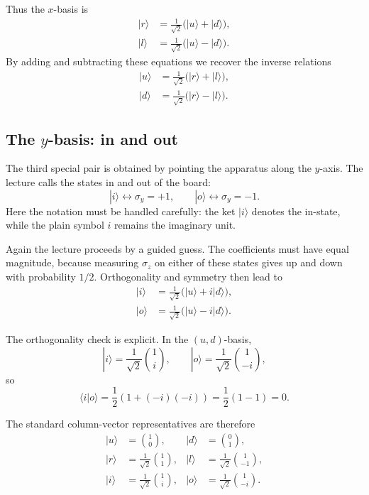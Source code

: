 Thus the \(x\)-basis is
\begin{align}
|r\rangle &= \frac{1}{\sqrt2}\bigl(|u\rangle+|d\rangle\bigr),\\
|l\rangle &= \frac{1}{\sqrt2}\bigl(|u\rangle-|d\rangle\bigr).
\end{align}
By adding and subtracting these equations we recover the inverse relations
\begin{align}
|u\rangle &= \frac{1}{\sqrt2}\bigl(|r\rangle+|l\rangle\bigr),\\
|d\rangle &= \frac{1}{\sqrt2}\bigl(|r\rangle-|l\rangle\bigr).
\end{align}

\subsection{The \(y\)-basis: in and out}

The third special pair is obtained by pointing the apparatus along the \(y\)-axis. The lecture calls the states in and out of the board:
\[
|i\rangle \leftrightarrow \sigma_y=+1,\qquad |o\rangle \leftrightarrow \sigma_y=-1.
\]
Here the notation must be handled carefully: the ket \(|i\rangle\) denotes the in-state, while the plain symbol \(i\) remains the imaginary unit.

Again the lecture proceeds by a guided guess. The coefficients must have equal magnitude, because measuring \(\sigma_z\) on either of these states gives up and down with probability \(1/2\). Orthogonality and symmetry then lead to
\begin{align}
|i\rangle &= \frac{1}{\sqrt2}\bigl(|u\rangle+i|d\rangle\bigr),\\
|o\rangle &= \frac{1}{\sqrt2}\bigl(|u\rangle-i|d\rangle\bigr).
\end{align}

The orthogonality check is explicit. In the \((u,d)\)-basis,
\[
|i\rangle=\frac{1}{\sqrt2}\binom{1}{i},\qquad
|o\rangle=\frac{1}{\sqrt2}\binom{1}{-i},
\]
so
\begin{equation}
\langle i|o\rangle
=\frac12\left(1+(-i)(-i)\right)
=\frac12(1-1)=0.
\end{equation}

The standard column-vector representatives are therefore
\begin{align}
|u\rangle &= \binom10, &
|d\rangle &= \binom01,\\
|r\rangle &= \frac{1}{\sqrt2}\binom11, &
|l\rangle &= \frac{1}{\sqrt2}\binom1{-1},\\
|i\rangle &= \frac{1}{\sqrt2}\binom1{i}, &
|o\rangle &= \frac{1}{\sqrt2}\binom1{-i}.
\end{align}

